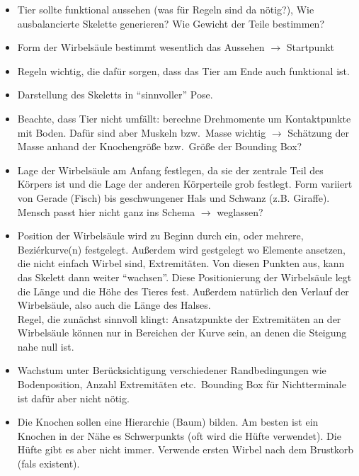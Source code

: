 \begin{itemize}
  \item Tier sollte funktional aussehen (was für Regeln sind da nötig?), Wie ausbalancierte Skelette generieren? Wie Gewicht der Teile bestimmen?
  \item Form der Wirbelsäule bestimmt wesentlich das Aussehen $\rightarrow$ Startpunkt
 \end{itemize}
 
\begin{itemize}
  \item Regeln wichtig, die dafür sorgen, dass das Tier am Ende auch funktional ist.
  \item Darstellung des Skeletts in "`sinnvoller"' Pose.
  \item Beachte, dass Tier nicht umfällt: berechne Drehmomente um Kontaktpunkte mit Boden. Dafür sind aber Muskeln bzw.\ Masse wichtig $\rightarrow$ Schätzung der Masse anhand der Knochengröße bzw.\ Größe der Bounding Box?
  
  \item Lage der Wirbelsäule am Anfang festlegen, da sie der zentrale Teil des Körpers ist und die Lage der anderen Körperteile grob festlegt. Form variiert von Gerade (Fisch) bis geschwungener Hals und Schwanz (z.B. Giraffe). Mensch passt hier nicht ganz ins Schema $\rightarrow$ weglassen?
  
  \item Position der Wirbelsäule wird zu Beginn durch ein, oder mehrere, Beziérkurve(n) festgelegt. Außerdem wird gestgelegt wo Elemente ansetzen, die nicht einfach Wirbel sind, \zb Extremitäten. Von diesen Punkten aus, kann das Skelett dann weiter "`wachsen"'. Diese Positionierung der Wirbelsäule legt die Länge und die Höhe des Tieres fest. Außerdem natürlich den Verlauf der Wirbelsäule, also \zb auch die Länge des Halses.\\
  Regel, die zunächst sinnvoll klingt: Ansatzpunkte der Extremitäten an der Wirbelsäule können nur in Bereichen der Kurve sein, an denen die Steigung nahe null ist.

  \item Wachstum unter Berücksichtigung verschiedener Randbedingungen wie Bodenposition, Anzahl Extremitäten etc.\ Bounding Box für Nichtterminale ist dafür aber nicht nötig.
  
  \item Die Knochen sollen eine Hierarchie (Baum) bilden. Am besten ist ein Knochen in der Nähe es Schwerpunkts (oft wird die Hüfte verwendet). Die Hüfte gibt es aber nicht immer. Verwende ersten Wirbel nach dem Brustkorb (fals existent).
\end{itemize}

